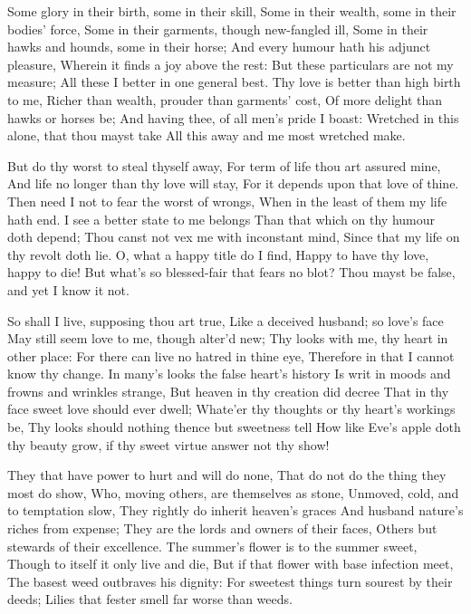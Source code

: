 \documentclass[twocolumn]{book}
\begin{document}
Some glory in their birth, some in their skill,
Some in their wealth, some in their bodies' force,
Some in their garments, though new-fangled ill,
Some in their hawks and hounds, some in their horse;
And every humour hath his adjunct pleasure,
Wherein it finds a joy above the rest:
But these particulars are not my measure;
All these I better in one general best.
Thy love is better than high birth to me,
Richer than wealth, prouder than garments' cost,
Of more delight than hawks or horses be;
And having thee, of all men's pride I boast:
  Wretched in this alone, that thou mayst take
  All this away and me most wretched make.


But do thy worst to steal thyself away,
For term of life thou art assured mine,
And life no longer than thy love will stay,
For it depends upon that love of thine.
Then need I not to fear the worst of wrongs,
When in the least of them my life hath end.
I see a better state to me belongs
Than that which on thy humour doth depend;
Thou canst not vex me with inconstant mind,
Since that my life on thy revolt doth lie.
O, what a happy title do I find,
Happy to have thy love, happy to die!
  But what's so blessed-fair that fears no blot?
  Thou mayst be false, and yet I know it not.


So shall I live, supposing thou art true,
Like a deceived husband; so love's face
May still seem love to me, though alter'd new;
Thy looks with me, thy heart in other place:
For there can live no hatred in thine eye,
Therefore in that I cannot know thy change.
In many's looks the false heart's history
Is writ in moods and frowns and wrinkles strange,
But heaven in thy creation did decree
That in thy face sweet love should ever dwell;
Whate'er thy thoughts or thy heart's workings be,
Thy looks should nothing thence but sweetness tell
  How like Eve's apple doth thy beauty grow,
  if thy sweet virtue answer not thy show!


They that have power to hurt and will do none,
That do not do the thing they most do show,
Who, moving others, are themselves as stone,
Unmoved, cold, and to temptation slow,
They rightly do inherit heaven's graces
And husband nature's riches from expense;
They are the lords and owners of their faces,
Others but stewards of their excellence.
The summer's flower is to the summer sweet,
Though to itself it only live and die,
But if that flower with base infection meet,
The basest weed outbraves his dignity:
  For sweetest things turn sourest by their deeds;
  Lilies that fester smell far worse than weeds.
\end{document}

